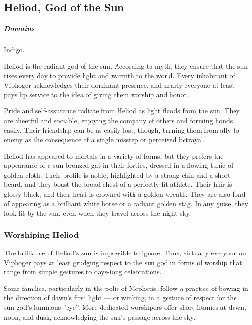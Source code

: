 \subsection*{Heliod, God of the Sun} \label{ssec::heliod}
    \subparagraph{Domains} Indigo.

    Heliod is the radiant god of the sun.
    According to myth, they ensure that the sun rises every day to provide light and warmth to the world.
    Every inhabitant of Viphoger acknowledges their dominant presence, and nearly everyone at least pays lip service to the idea of giving them worship and honor.

    Pride and self-assurance radiate from Heliod as light floods from the sun.
    They are cheerful and sociable, enjoying the company of others and forming bonds easily.
    Their friendship can be as easily lost, though, turning them from ally to enemy as the consequence of a single misstep or perceived betrayal.

    Heliod has appeared to mortals in a variety of forms, but they prefers the appearance of a sun-bronzed gat in their forties, dressed in a flowing tunic of golden cloth.
    Their profile is noble, highlighted by a strong chin and a short beard, and they boast the broad chest of a perfectly fit athlete.
    Their hair is glossy black, and their head is crowned with a golden wreath.
    They are also fond of appearing as a brilliant white horse or a radiant golden stag.
    In any guise, they look lit by the sun, even when they travel across the night sky.


    \subsubsection{Worshiping Heliod}
        The brilliance of Heliod's sun is impossible to ignore.
        Thus, virtually everyone on Viphoger pays at least grudging respect to the sun god in forms of worship that range from simple gestures to days-long celebrations.

        Some families, particularly in the polis of Mephetis, follow a practice of bowing in the direction of dawn's first light --- or winking, in a gesture of respect for the sun god's luminous ``eye''.
        More dedicated worshipers offer short litanies at dawn, noon, and dusk, acknowledging the sun's passage across the sky.
